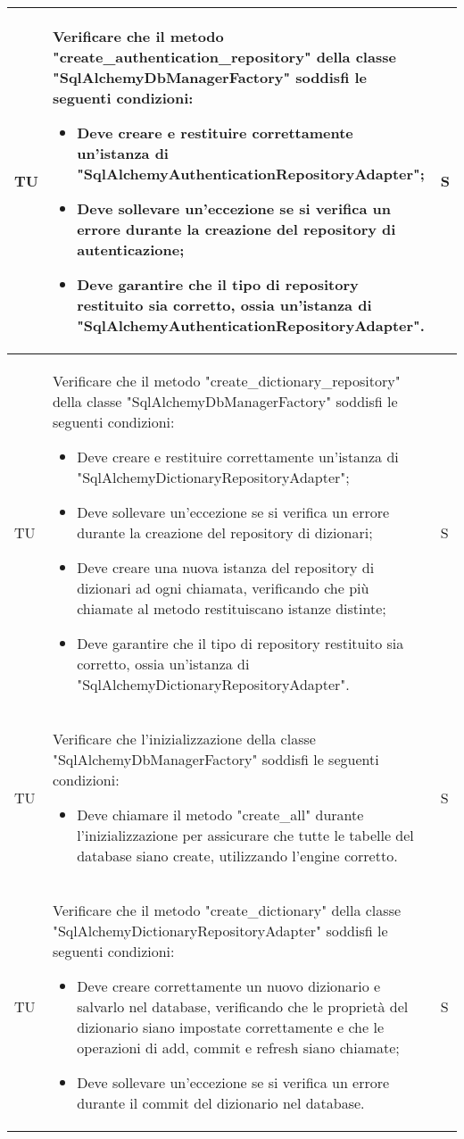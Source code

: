 \begin{adjustwidth}{-0.5cm}{-0.5cm}
\begin{longtable}{|P{1.5cm}|>{\raggedright}P{9.5cm}|>{\arraybackslash}P{1.5cm}|}
		\hline TU & Verificare che il metodo "create\_authentication\_repository" della classe "SqlAlchemyDbManagerFactory" soddisfi le seguenti condizioni:
		\begin{itemize}
			\item Deve creare e restituire correttamente un'istanza di "SqlAlchemyAuthenticationRepositoryAdapter";
			\item Deve sollevare un'eccezione se si verifica un errore durante la creazione del repository di autenticazione;
			\item Deve garantire che il tipo di repository restituito sia corretto, ossia un'istanza di "SqlAlchemyAuthenticationRepositoryAdapter".
		\end{itemize} & S \\

		\hline TU & Verificare che il metodo "create\_dictionary\_repository" della classe "SqlAlchemyDbManagerFactory" soddisfi le seguenti condizioni:
		\begin{itemize}
			\item Deve creare e restituire correttamente un'istanza di "SqlAlchemyDictionaryRepositoryAdapter";
			\item Deve sollevare un'eccezione se si verifica un errore durante la creazione del repository di dizionari;
			\item Deve creare una nuova istanza del repository di dizionari ad ogni chiamata, verificando che più chiamate al metodo restituiscano istanze distinte;
			\item Deve garantire che il tipo di repository restituito sia corretto, ossia un'istanza di "SqlAlchemyDictionaryRepositoryAdapter".
		\end{itemize} & S \\

		\hline TU & Verificare che l'inizializzazione della classe "SqlAlchemyDbManagerFactory" soddisfi le seguenti condizioni:
		\begin{itemize}
			\item Deve chiamare il metodo "create\_all" durante l'inizializzazione per assicurare che tutte le tabelle del database siano create, utilizzando l'engine corretto.
		\end{itemize} & S \\

		\hline TU & Verificare che il metodo "create\_dictionary" della classe "SqlAlchemyDictionaryRepositoryAdapter" soddisfi le seguenti condizioni:
		\begin{itemize}
			\item Deve creare correttamente un nuovo dizionario e salvarlo nel database, verificando che le proprietà del dizionario siano impostate correttamente e che le operazioni di add, commit e refresh siano chiamate;
			\item Deve sollevare un'eccezione se si verifica un errore durante il commit del dizionario nel database.
		\end{itemize} & S \\


\end{longtable}
\end{adjustwidth}
